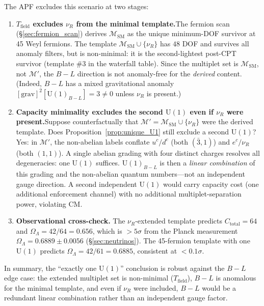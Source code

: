 \documentclass[11pt,a4paper]{article}
\theoremstyle{definition}
\newcommand{\U}{\mathrm{U}}
\begin{document}
The APF excludes this scenario at two stages:
\begin{enumerate}[label=(\alph*),nosep]
  \item \textbf{$T_{\mathrm{field}}$ excludes $\nu_R$ from the minimal
  template.}\quad The fermion scan (\S\ref{sec:fermion_scan}) derives
  $\mathcal{M}_{\mathrm{SM}}$ as the unique minimum-DOF survivor at
  45 Weyl fermions.  The template
  $\mathcal{M}_{\mathrm{SM}} \cup \{\nu_R\}$ has $48$ DOF and survives
  all anomaly filters, but is non-minimal: it is the second-lightest
  post-CPT survivor (template \#3 in the waterfall table).  Since the
  multiplet set is $\mathcal{M}_{\mathrm{SM}}$, not $\mathcal{M}'$,
  the $B{-}L$ direction is not anomaly-free for the \emph{derived}
  content.  (Indeed, $B{-}L$ has a mixed gravitational anomaly
  $[\mathrm{grav}]^2[\U(1)_{B-L}] = 3 \ne 0$ unless $\nu_R$ is
  present.)
  \item \textbf{Capacity minimality excludes the second $\U(1)$ even
  if $\nu_R$ were present.}\quad Suppose counterfactually that
  $\mathcal{M}' = \mathcal{M}_{\mathrm{SM}} \cup \{\nu_R\}$ were the
  derived template.  Does Proposition~\ref{prop:unique_U1} still
  exclude a second $\U(1)$?  Yes: in $\mathcal{M}'$, the non-abelian
  labels conflate $u^c / d^c$ (both $(\bar{3},1)$) and
  $e^c / \nu_R$ (both $(1,1)$).  A single abelian grading with four
  distinct charges resolves all degeneracies: one $\U(1)$ suffices.
  $\U(1)_{B-L}$ is then a \emph{linear combination} of this grading
  and the non-abelian quantum numbers---not an independent gauge
  direction.  A second independent $\U(1)$ would carry capacity cost
  (one additional enforcement channel) with no additional
  multiplet-separation power, violating CM.
  \item \textbf{Observational cross-check.}\quad
  The $\nu_R$-extended template predicts $C_{\mathrm{total}} = 64$ and
  $\Omega_\Lambda = 42/64 = 0.656$, which is $> 5\sigma$ from the
  Planck measurement $\Omega_\Lambda = 0.6889 \pm 0.0056$
  (\S\ref{sec:neutrinos}).  The 45-fermion template with one $\U(1)$
  predicts $\Omega_\Lambda = 42/61 = 0.6885$, consistent at
  $< 0.1\sigma$.
\end{enumerate}
In summary, the ``exactly one $\U(1)$'' conclusion is robust against
the $B{-}L$ edge case: the extended multiplet set is non-minimal
($T_{\mathrm{field}}$), $B{-}L$ is anomalous for the minimal template,
and even if $\nu_R$ were included, $B{-}L$ would be a redundant linear
combination rather than an independent gauge factor.
\end{document}
